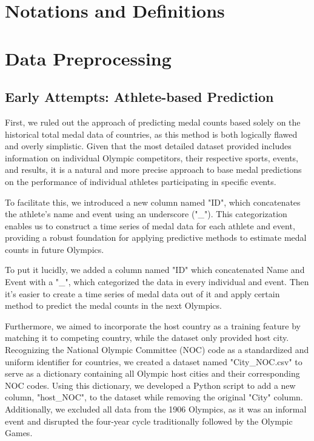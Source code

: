 \documentclass{mcmthesis}
\begin{document}
\section{Notations and Definitions}


\section{Data Preprocessing}
\subsection{Early Attempts: Athlete-based Prediction}
First, we ruled out the approach of predicting medal counts based solely on the historical total medal data of countries, as this method is both logically flawed and overly simplistic. Given that the most detailed dataset provided includes information on individual Olympic competitors, their respective sports, events, and results, it is a natural and more precise approach to base medal predictions on the performance of individual athletes participating in specific events.

To facilitate this, we introduced a new column named "ID", which concatenates the athlete's name and event using an underscore ("\_"). This categorization enables us to construct a time series of medal data for each athlete and event, providing a robust foundation for applying predictive methods to estimate medal counts in future Olympics.

To put it lucidly, we added a column named "ID" which concatenated Name and Event with a "\_", which categorized the data in every individual and event. Then it's easier to create a time series of medal data out of it and apply certain method to predict the medal counts in the next Olympics.

Furthermore, we aimed to incorporate the host country as a training feature by matching it to competing country, while the dataset only provided host city. Recognizing the National Olympic Committee (NOC) code as a standardized and uniform identifier for countries, we created a dataset named "City\_NOC.csv" to serve as a dictionary containing all Olympic host cities and their corresponding NOC codes. Using this dictionary, we developed a Python script to add a new column, "host\_NOC", to the dataset while removing the original "City" column. Additionally, we excluded all data from the 1906 Olympics, as it was an informal event and disrupted the four-year cycle traditionally followed by the Olympic Games.
\end{document}
